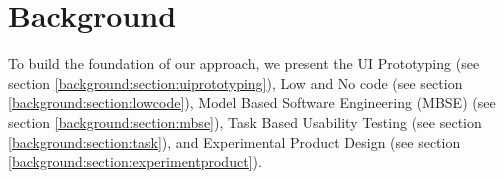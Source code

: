 
\chapter{Background}
\ifpdf
    \graphicspath{{Chapters/Background/Figs/}{Chapters/Background/Figs/}{Chapters/Background/Figs/}}
\else
    \graphicspath{{Chapters/Background/Figs/}{Chapters/Background/Figs/}}
\fi
To build the foundation of our approach, we present the UI Prototyping (see section \ref{background:section:uiprototyping}), Low and No code (see section \ref{background:section:lowcode}), Model Based Software Engineering (MBSE) (see section \ref{background:section:mbse}), Task Based Usability Testing (see section \ref{background:section:task}), and Experimental Product Design (see section \ref{background:section:experimentproduct}).

